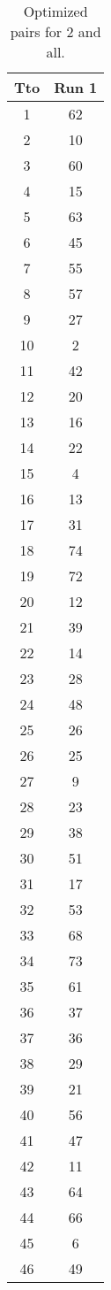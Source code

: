 \begin{table}
  \centering
  \scriptsize
  \caption{Optimized pairs for 2 and all.}
  \label{tab_pairs}
\begin{tabular}{c c }
\hline
Tto & Run 1 \\
\hline
1 & 62 \\
2 & 10 \\
3 & 60 \\
4 & 15 \\
5 & 63 \\
6 & 45 \\
7 & 55 \\
8 & 57 \\
9 & 27 \\
10 & 2 \\
11 & 42 \\
12 & 20 \\
13 & 16 \\
14 & 22 \\
15 & 4 \\
16 & 13 \\
17 & 31 \\
18 & 74 \\
19 & 72 \\
20 & 12 \\
21 & 39 \\
22 & 14 \\
23 & 28 \\
24 & 48 \\
25 & 26 \\
26 & 25 \\
27 & 9 \\
28 & 23 \\
29 & 38 \\
30 & 51 \\
31 & 17 \\
32 & 53 \\
33 & 68 \\
34 & 73 \\
35 & 61 \\
36 & 37 \\
37 & 36 \\
38 & 29 \\
39 & 21 \\
40 & 56 \\
41 & 47 \\
42 & 11 \\
43 & 64 \\
44 & 66 \\
45 & 6 \\
46 & 49 \\

\end{tabular}
\end{table}
